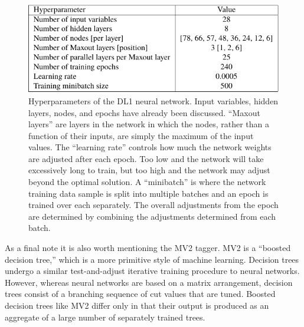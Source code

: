             \begin{figure}[tbh] \center
                \includegraphics[width=0.7\linewidth,height=\textheight,keepaspectratio]{tables/reconstruction/DL1_hyperparams}
                \caption{
                    Hyperparameters of the DL1 neural network\cite{bjet_id_and_performance}.
                    Input variables, hidden layers, nodes, and epochs have already been discussed.
                    ``Maxout layers'' are layers in the network in which the nodes, rather than a function of their inputs,
                        are simply the maximum of the input values.
                    The ``learning rate'' controls how much the network weights are adjusted after each epoch.
                    Too low and the network will take excessively long to train,
                        but too high and the network may adjust beyond the optimal solution.
                    A ``minibatch'' is where the network training data sample is split into multiple batches and an epoch is trained over each separately.
                    The overall adjustments from the epoch are determined by combining the adjustments determined from each batch.
                }
                \label{tab:DL1_hyperparams}
            \end{figure}

            As a final note it is also worth mentioning the MV2 tagger.
            MV2 is a ``boosted decision tree,'' which is a more primitive style of machine learning.
            Decision trees undergo a similar test-and-adjust iterative training procedure to neural networks.
            However, whereas neural networks are based on a matrix arrangement,
                decision trees consist of a branching sequence of cut values that are tuned.
            Boosted decision trees like MV2 differ only in that their output is produced as an aggregate of a large number of
                separately trained trees.


